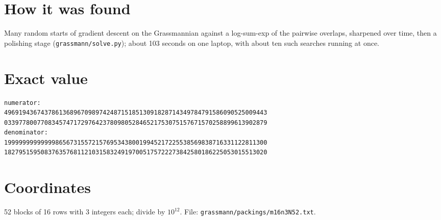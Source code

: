 \documentclass[11pt,a4paper]{article}
\begin{document}
\section{How it was found}
Many random starts of gradient descent on the Grassmannian against a log-sum-exp of the pairwise overlaps, sharpened over time, then a polishing stage (\texttt{grassmann/solve.py}); about 103 seconds on one laptop, with about ten such searches running at once.


\appendix
\section{Exact value}
{\small
\begin{verbatim}
numerator:
496919436743786136896709897424871518513091828714349784791586090525009443
033977800770834574717297642378098052846521753075157671570258899613902879
denominator:
199999999999998656731557215769534380019945217225538569838716331122811300
182795159508376357681121031583249197005175722273842580186225053015513020
\end{verbatim}}

\section{Coordinates}
52 blocks of 16 rows with 3 integers each; divide by $10^{12}$. File: \texttt{grassmann/packings/m16n3N52.txt}.
{\tiny
\begin{multicols}{3}
\end{multicols}}
\end{document}
